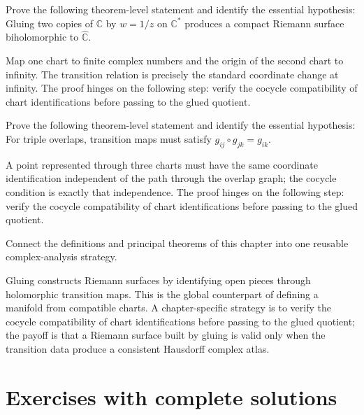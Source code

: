 \begin{problem}\label{prob:iv25-problem-10}
Prove the following theorem-level statement and identify the essential hypothesis: Gluing two copies of $\mathbb C$ by $w=1/z$ on $\mathbb C^*$ produces a compact Riemann surface biholomorphic to $\widehat{\mathbb C}$.
\end{problem}
\begin{solution}
Map one chart to finite complex numbers and the origin of the second chart to infinity. The transition relation is precisely the standard coordinate change at infinity. The proof hinges on the following step: verify the cocycle compatibility of chart identifications before passing to the glued quotient.
\end{solution}

\begin{problem}\label{prob:iv25-problem-11}
Prove the following theorem-level statement and identify the essential hypothesis: For triple overlaps, transition maps must satisfy $g_{ij}\circ g_{jk}=g_{ik}$.
\end{problem}
\begin{solution}
A point represented through three charts must have the same coordinate identification independent of the path through the overlap graph; the cocycle condition is exactly that independence. The proof hinges on the following step: verify the cocycle compatibility of chart identifications before passing to the glued quotient.
\end{solution}

\begin{problem}\label{prob:iv25-problem-12}
Connect the definitions and principal theorems of this chapter into one reusable complex-analysis strategy.
\end{problem}
\begin{solution}
Gluing constructs Riemann surfaces by identifying open pieces through holomorphic transition maps. This is the global counterpart of defining a manifold from compatible charts. A chapter-specific strategy is to verify the cocycle compatibility of chart identifications before passing to the glued quotient; the payoff is that a Riemann surface built by gluing is valid only when the transition data produce a consistent Hausdorff complex atlas.
\end{solution}

\section{Exercises with complete solutions}


